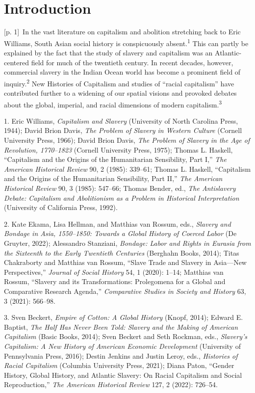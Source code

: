 \documentclass[10pt,a4paper]{article}
\begin{document}
\section*{Introduction}
{\scriptsize\color{gray} [p. 1]}\ In the vast literature on capitalism and abolition stretching back to Eric Williams, South Asian social history is conspicuously absent.\nobreak\textsuperscript{1} This can partly be explained by the fact that the study of slavery and capitalism was an Atlantic-centered field for much of the twentieth century. In recent decades, however, commercial slavery in the Indian Ocean world has become a prominent field of inquiry.\nobreak\textsuperscript{2} New Histories of Capitalism and studies of “racial capitalism” have contributed further to a widening of our spatial visions and provoked debates about the global, imperial, and racial dimensions of modern capitalism.\nobreak\textsuperscript{3}\par{\small 1. Eric Williams, \textit{Capitalism and Slavery} (University of North Carolina Press, 1944); David Brion Davis, \textit{The Problem of Slavery in Western Culture} (Cornell University Press, 1966); David Brion Davis, \textit{The Problem of Slavery in the Age of Revolution, 1770}–\textit{1823} (Cornell University Press, 1975); Thomas L. Haskell, “Capitalism and the Origins of the Humanitarian Sensibility, Part I,” \textit{The American Historical Review} 90, 2 (1985): 339–61; Thomas L. Haskell, “Capitalism and the Origins of the Humanitarian Sensibility, Part II,” \textit{The American Historical Review} 90, 3 (1985): 547–66; Thomas Bender, ed., \textit{The Antislavery Debate: Capitalism and Abolitionism as a Problem in Historical Interpretation} (University of California Press, 1992).\par}{\small 2. Kate Ekama, Lisa Hellman, and Matthias van Rossum, eds., \textit{Slavery and Bondage in Asia, 1550–1850: Towards a Global History of Coerced Labor} (De Gruyter, 2022); Alessandro Stanziani, \textit{Bondage: Labor and Rights in Eurasia from the Sixteenth to the Early Twentieth Centuries} (Berghahn Books, 2014); Titas Chakraborty and Matthias van Rossum, “Slave Trade and Slavery in Asia—New Perspectives,” \textit{Journal of Social History} 54, 1 (2020): 1–14; Matthias van Rossum, “Slavery and its Transformations: Prolegomena for a Global and Comparative Research Agenda,” \textit{Comparative Studies in Society and History} 63, 3 (2021): 566–98.\par}{\small 3. Sven Beckert, \textit{Empire of Cotton: A Global History} (Knopf, 2014); Edward E. Baptist, \textit{The Half Has Never Been Told: Slavery and the Making of American Capitalism} (Basic Books, 2014); Sven Beckert and Seth Rockman, eds., \textit{Slavery’s Capitalism: A New History of American Economic Development} (University of Pennsylvania Press, 2016); Destin Jenkins and Justin Leroy, eds., \textit{Histories of Racial Capitalism} (Columbia University Press, 2021); Diana Paton, “Gender History, Global History, and Atlantic Slavery: On Racial Capitalism and Social Reproduction,” \textit{The American Historical Review} 127, 2 (2022): 726–54.\par}
\end{document}
